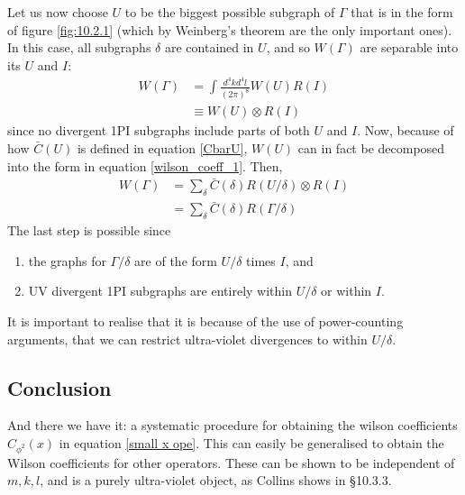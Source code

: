 \documentclass{article}
\begin{document}
Let us now choose $U$ to be the biggest possible subgraph of $\Gamma$ that is in the form of figure \ref{fig:10.2.1} (which by Weinberg's theorem are the only important ones). In this case, all subgraphs $\delta$ are contained in $U$, and so $W(\Gamma)$ are separable into its $U$ and $I$:
\begin{equation}
\begin{split}
    W(\Gamma) &= \int \frac{d^4k d^4l}{(2\pi)^8}W(U)R(I)\\
    &\equiv W(U) \otimes R(I)
\end{split}
\end{equation}
since no divergent 1PI subgraphs include parts of both $U$ and $I$. Now, because of how $\bar{C}(U)$ is defined in equation \ref{CbarU}, $W(U)$ can in fact be decomposed into the form in equation \ref{wilson_coeff_1}. Then, 
\begin{equation}
\begin{split}
    W(\Gamma) &= \sum_\delta \bar{C}(\delta) R(U/\delta) \otimes R(I)\\
    &=\sum_\delta \bar{C}(\delta) R(\Gamma/\delta)
\end{split}
\end{equation}
The last step is possible since
\begin{enumerate}
    \item the graphs for $\Gamma/\delta$ are of the form $U/\delta$ times $I$, and
    \item UV divergent 1PI subgraphs are entirely within $U/\delta$ or within $I$. 
\end{enumerate}
It is important to realise that it is because of the use of power-counting arguments, that we can restrict ultra-violet divergences to within $U/\delta$. 


\subsection{Conclusion}
And there we have it: a systematic procedure for obtaining the wilson coefficients $C_{\phi^2}(x)$ in equation \ref{small x ope}. This can easily be generalised to obtain the Wilson coefficients for other operators. These can be shown to be independent of $m, k, l$, and is a purely ultra-violet object, as Collins shows in \S 10.3.3. 



 

\end{document}
